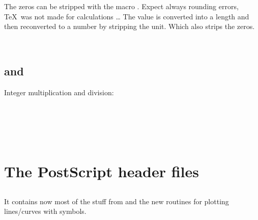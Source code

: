 \documentclass[11pt,english,BCOR=10mm,DIV12,bibliography=totoc,parskip=false,headings=small,,
    headinclude=false,footinclude=false,oneside]{pst-doc}
\begin{document}
The zeros can be stripped with the macro . Expect 
always rounding errors, \TeX\ was not made for calculations \ldots
The value is converted into a length and then reconverted to a 
number by stripping the unit. Which also strips the zeros.

\begin{LTXexample}[width=5cm]
\pstFPmul{} 
\pstFPstripZeros{\Result}{\Result}\Result\quad
\pstFPdiv{} 
\pstFPstripZeros{\Result}{\Result}\Result\\
\pstFPmul{} 
\pstFPstripZeros{\Result}{\Result}\Result\quad
\pstFPdiv{} 
\pstFPstripZeros{\Result}{\Result}\Result
\end{LTXexample}

\subsection{ and }
Integer multiplication and division:

\begin{BDef}
\\
\end{BDef}

\begin{LTXexample}[width=5cm]
\makeatletter
\pstFPMul{} \Result\quad
\pstFPDiv{} \Result\\
\pstFPMul{} \Result\quad
\pstFPDiv{} \Result\\
\pstFPMul{} \Result\quad
\pstFPDiv{} \Result
\makeatother
\end{LTXexample}

\section{The PostScript header files}
\subsection{}
It contains now most of the stuff from  and the new routines
for plotting lines/curves with symbols.
\end{document}
